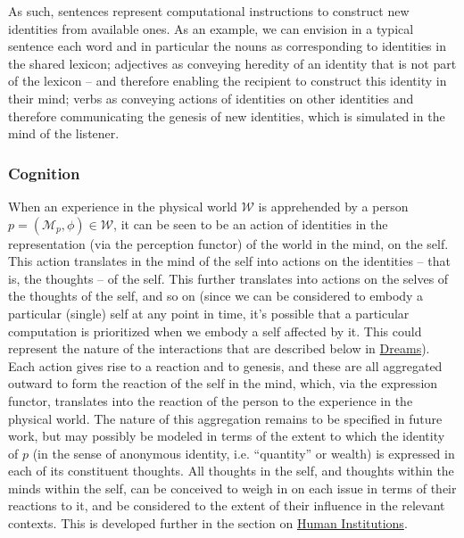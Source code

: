 \documentclass[pra,twocolumn,groupedaddress,10pt]{revtex4}
\theoremstyle{definition}
\begin{document}
As such, sentences represent computational instructions to construct new identities from available ones. As an example, we can envision in a typical sentence each word and in particular the nouns as corresponding to identities in the shared lexicon; adjectives as conveying heredity of an identity that is not part of the lexicon -- and therefore enabling the recipient to construct this identity in their mind; verbs as conveying actions of identities on other identities and therefore communicating the genesis of new identities, which is simulated in the mind of the listener.

\subsubsection{Cognition} \label{sec:cognition}

When an experience in the physical world $\mathcal{W}$ is apprehended by a person $p = (\mathcal{M}_{p}, \phi) \in \mathcal{W}$, it can be seen to be an action of identities in the representation (via the perception functor) of the world in the mind, on the self. This action translates in the mind of the self into actions on the identities -- that is, the thoughts -- of the self. This further translates into actions on the selves of the thoughts of the self, and so on (since we can be considered to embody a particular (single) self at any point in time, it's possible that a particular computation is prioritized when we embody a self affected by it. This could represent the nature of the interactions that are described below in \hyperref[sec:dreams]{Dreams}). Each action gives rise to a reaction and to genesis, and these are all aggregated outward to form the reaction of the self in the mind, which, via the expression functor, translates into the reaction of the person to the experience in the physical world. The nature of this aggregation remains to be specified in future work, but may possibly be modeled in terms of the extent to which the identity of $p$ (in the sense of anonymous identity, i.e. ``quantity'' or wealth) is expressed in each of its constituent thoughts. All thoughts in the self, and thoughts within the minds within the self, can be conceived to weigh in on each issue in terms of their reactions to it, and be considered to the extent of their influence in the relevant contexts. This is developed further in the section on \hyperref[sec:humins]{Human Institutions}.
\end{document}

